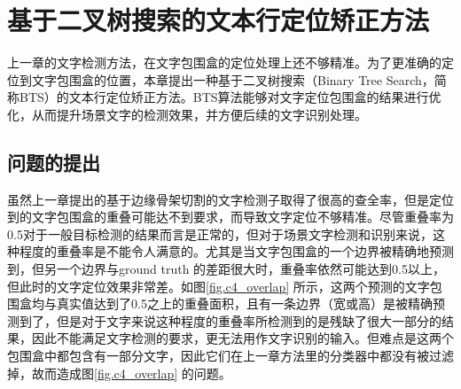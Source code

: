 ﻿%
%
%
%
%
%

\chapter{基于二叉树搜索的文本行定位矫正方法}

    上一章的文字检测方法，在文字包围盒的定位处理上还不够精准。为了更准确的定位到文字包围盒的位置，本章提出一种基于二叉树搜索（Binary Tree Search，简称BTS）的文本行定位矫正方法。BTS算法能够对文字定位包围盒的结果进行优化，从而提升场景文字的检测效果，并方便后续的文字识别处理。

    \section{问题的提出}

    虽然上一章提出的基于边缘骨架切割的文字检测子取得了很高的查全率，但是定位到的文字包围盒的重叠可能达不到要求，而导致文字定位不够精准。尽管重叠率为0.5对于一般目标检测的结果而言是正常的，但对于场景文字检测和识别来说，这种程度的重叠率是不能令人满意的。尤其是当文字包围盒的一个边界被精确地预测到，但另一个边界与ground truth 的差距很大时，重叠率依然可能达到0.5以上，但此时的文字定位效果非常差。如图\ref{fig.c4_overlap} 所示，这两个预测的文字包围盒均与真实值达到了0.5之上的重叠面积，且有一条边界（宽或高）是被精确预测到了，但是对于文字来说这种程度的重叠率所检测到的是残缺了很大一部分的结果，因此不能满足文字检测的要求，更无法用作文字识别的输入。但难点是这两个包围盒中都包含有一部分文字，因此它们在上一章方法里的分类器中都没有被过滤掉，故而造成图\ref{fig.c4_overlap} 的问题。


